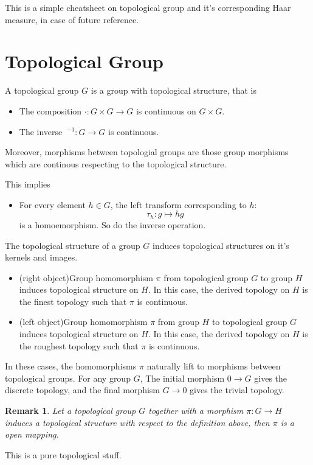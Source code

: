 \documentclass[12pt,a4paper]{article}
\newtheorem{rem}{Remark}
\begin{document}
This is a simple cheatsheet on topological group and it's corresponding Haar measure, in case of future reference.

\section{Topological Group}
A topological group $G$ is a group with topological structure, that is
\begin{itemize}
    \item The composition $\cdot: G\times G\rightarrow G$ is continuous on $G\times G$.
    \item The inverse $\ ^{-1}: G\rightarrow G$ is continuous.
\end{itemize}

Moreover, morphisms between topologial groups are those group morphisms which are continous respecting to the topological structure.

This implies
\begin{itemize}
    \item For every element $h\in G$, the left transform corresponding to $h$:
        \[\tau_h: g\mapsto hg\]
        is a homoemorphism. So do the inverse operation.
\end{itemize}

The topological structure of a group $G$ induces topological structures on it's kernels and images.
\begin{itemize}
    \item (right object)Group homomorphism $\pi$ from topological group $G$ to group $H$ induces topological structure on $H$. In this case, the derived topology on $H$ is the finest topology such that $\pi$ is continuous.
    \item (left object)Group homomorphism $\pi$ from group $H$ to topological group $G$ induces topological structure on $H$. In this case, the derived topology on $H$ is the roughest topology such that $\pi$ is continuous.
\end{itemize}
In these cases, the homomorphisms $\pi$ naturally lift to morphisms between topological groups. For any group $G$, The initial morphism $0\rightarrow G$ gives the discrete topology, and the final morphism $G\rightarrow 0$ gives the trivial topology.
\begin{rem}
    Let a topological group $G$ together with a morphism $\pi: G\rightarrow H$ induces a topological structure with respect to the definition above, then $\pi$ is a open mapping.
\end{rem}
This is a pure topological stuff.
\end{document}
